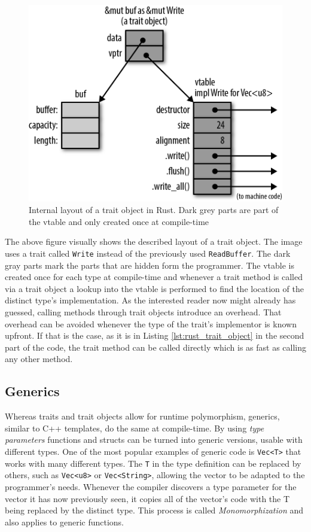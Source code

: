 \begin{figure}[h!]
	\centering \includegraphics[width=\linewidth]{PICs/rust_vtable.png}
	\caption{Internal layout of a trait object in Rust. Dark grey parts are part of the vtable and only created once at compile-time}
	\label{fig:rust_vtable}
\end{figure}

\noindent
The above figure visually shows the described layout of a trait object. The image uses a trait called \texttt{Write} instead of the previously used \texttt{ReadBuffer}. The dark gray parts mark the parts that are hidden form the programmer. The vtable is created once for each type at compile-time and whenever a trait method is called via a trait object a lookup into the vtable is performed to find the location of the distinct type's implementation. As the interested reader now might already has guessed, calling methods through trait objects introduce an overhead.
That overhead can be avoided whenever the type of the trait's implementor is known upfront. If that is the case, as it is in Listing \ref{lst:rust_trait_object} in the second part of the code, the trait method can be called directly which is as fast as calling any other method.

\subsection{Generics}

Whereas traits and trait objects allow for runtime polymorphism, generics, similar to C++ templates, do the same at compile-time. By using \textit{type parameters} functions and structs can be turned into generic versions, usable with different types. One of the most popular examples of generic code is \texttt{Vec<T>} that works with many different types. The \texttt{T} in the type definition can be replaced by others, such as \texttt{Vec<u8>} or \texttt{Vec<String>}, allowing the vector to be adapted to the programmer's needs. Whenever the compiler discovers a type parameter for the vector it has now previously seen, it copies all of the vector's code with the T being replaced by the distinct type. This process is called \textit{Monomorphization} and also applies to generic functions.\\

